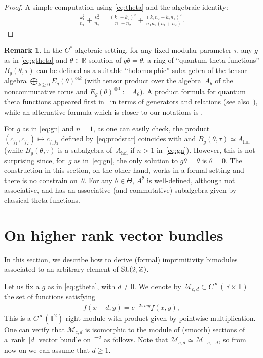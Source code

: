 \documentclass[10pt,a4paper]{amsart}
\numberwithin{equation}{section}
\theoremstyle{definition}
\newtheorem{rem}[thm]{Remark}
\newcommand{\R}{\mathbb{R}}
\newcommand{\Z}{\mathbb{Z}}
\newcommand{\T}{\mathbb{T}}
\begin{document}
\begin{proof}
A simple computation using \eqref{eq:theta} and the algebraic identity:
\begin{gather*}
\frac{k_1^2}{n_1}+\frac{k_2^2}{n_2}=
\frac{(k_1+k_2)^2}{n_1+n_2}+
\frac{(k_1n_2-k_2n_1)^2}{n_1n_2(n_1+n_2)}.\tag*{\qed}
\end{gather*}
 \renewcommand{\qed}{}
\end{proof}

\begin{rem}
In the $C^*$-algebraic setting,
for any f\/ixed modular parameter $\tau$, any $g$ as in \eqref{eq:gtheta} and $\theta\in\R$ solution of $g\theta=\theta$, a ring of ``quantum theta functions'' $B_g(\theta,\tau)$ can be def\/ined as a suitable ``holomorphic'' subalgebra of the tensor algebra $\bigoplus_{k\geq 0}E_g(\theta)^{\otimes k}$ (with tensor product over the algebra~$A_\theta$ of the noncommutative torus
and $E_g(\theta)^{\otimes 0}:=A_\theta$).
A product formula for quantum theta functions appeared f\/irst in~\cite{DS02} in terms of generators and relations (see also~\cite{PS02}), while an alternative formula which is closer to our notations is \cite[equation~(7.4)]{Vla06}.

For $g$ as in \eqref{eq:gn} and $n=1$, as one can easily check, the product $(c_{f_1},c_{f_2})\mapsto c_{f_1f_2}$ def\/ined by~\eqref{eq:prodstar} coincides with \cite[equation~(7.4)]{Vla06} and $B_g(\theta,\tau)\simeq A_{\mathrm{hol}}$
(while $B_g(\theta,\tau)$ is a subalgebra of~$A_{\mathrm{hol}}$ if $n>1$ in~\eqref{eq:gn}).
However, this is not surprising since, for~$g$ as in~\eqref{eq:gn}, the only solution to $g\theta=\theta$ is $\theta=0$.
The construction in this section, on the other hand, works in a formal setting and there is no constrain on~$\theta$. For any $\theta\in\Theta$, $A^\theta$ is well-def\/ined, although not associative, and has an associative (and commutative) subalgebra given by classical theta functions.
\end{rem}

\section{On higher rank vector bundles}\label{sec:6}
In this section, we describe how to derive (formal) imprimitivity bimodules associated to an arbitrary element of ${\rm SL}(2,\Z)$.

Let us f\/ix a $g$ as in \eqref{eq:gtheta}, with $d\neq 0$.
We denote by $\mathcal{M}_{c,d}\subset C^\infty(\R\times\T)$ the set of functions satisfying
\begin{gather}\label{eq:Mcd}
f(x+d,y)=e^{-2\pi icy}f(x,y) ,
\end{gather}
This is a $C^\infty(\T^2)$-right module with product given by pointwise multiplication.
One can verify that $\mathcal{M}_{c,d}$ is isomorphic to the module of (smooth) sections of a~rank~$|d|$ vector bundle on~$\T^2$ as follows.
Note that $\mathcal{M}_{c,d}\simeq\mathcal{M}_{-c,-d}$, so from now on we can assume that $d\geq 1$.
\end{document}
